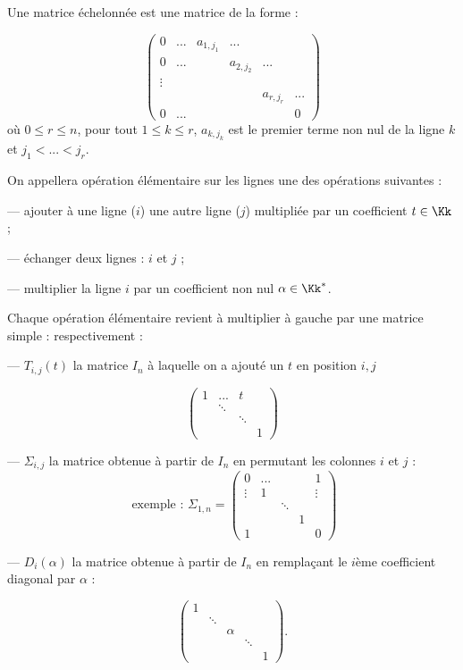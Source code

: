 \documentclass[class=report,crop=false]{standalone}
\begin{document}
\begin{definition}
Une matrice échelonnée est une matrice de la forme :

\[\left(\begin{array}{ccccccc}
0 & ...  & a_{1,{j_1}} & ...& &\\
0& ... &  & a_{2,{j_2}} & ...&\\
\vdots &&&&&\\
&&  && a_{r,j_r}&... \\
0 &...& &&&0
\end{array}\right)\]
où $0 \le r \le n$, pour tout $1 \le k \le r$, $a_{k,j_k}$ est le premier terme non nul de la ligne $k$ et $j_1 < ... < j_r$.
\end{definition}

On appellera opération élémentaire sur les lignes une des opérations suivantes :

--- ajouter à une ligne ($i$) une autre ligne ($j$) multipliée par un coefficient $t\in \Kk$ ;

--- échanger deux lignes : $i$ et $j$ ;

--- multiplier la ligne $i$ par un coefficient non nul $\alpha \in \Kk^*$.

\begin{remarque*}
Chaque opération élémentaire revient à multiplier à gauche par une matrice \og simple \fg : respectivement :

--- $T_{i,j}(t)$ \og la matrice $I_n$ à laquelle on a ajouté un $t$ en position $i,j$ \fg\ 

\[\left(
\begin{array}{cccc}
1 & ...&t &\\
&\ddots &&\\
&&\ddots&\\
&&&1
\end{array}
\right)
\]

--- $\Sigma_{i,j}$ \og la matrice obtenue à partir de $I_n$ en permutant les colonnes $i$ et $j$ \fg :
\[\mbox{ exemple : } \Sigma_{1,n }=
\left(
\begin{array}{ccccc}
0 & ... &&&1\\
\vdots & 1 &&&\vdots\\
&&\ddots&&\\
&&&1&\\
1 &&&&0
\end{array}\right)\]

--- $D_i(\alpha)$ \og la matrice obtenue à partir de $I_n$ en rempla\c{c}ant le $i$ème coefficient diagonal par $\alpha$ :

\[\left(\begin{array}{ccccc}
1 &&&&\\
&\ddots &&&\\
&&\alpha &&\\
&&&\ddots &\\
&&&&1
\end{array}\right).\]
\end{remarque*}
\end{document}
